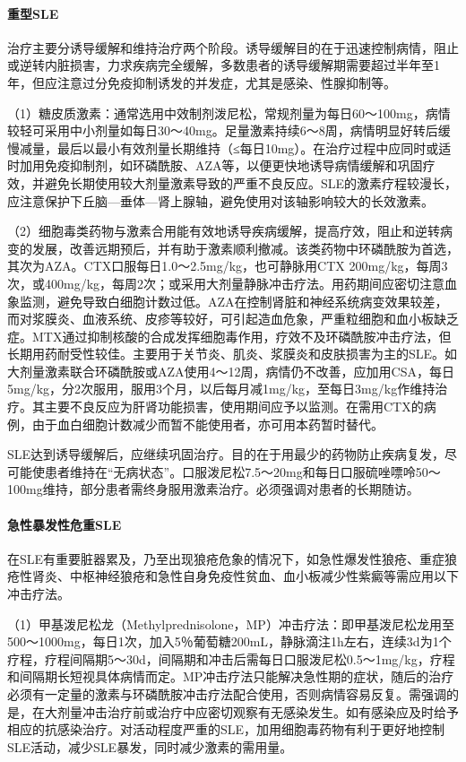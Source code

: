 \paragraph{重型SLE}

治疗主要分诱导缓解和维持治疗两个阶段。诱导缓解目的在于迅速控制病情，阻止或逆转内脏损害，力求疾病完全缓解，多数患者的诱导缓解期需要超过半年至1年，但应注意过分免疫抑制诱发的并发症，尤其是感染、性腺抑制等。

（1）糖皮质激素：通常选用中效制剂泼尼松，常规剂量为每日60～100mg，病情较轻可采用中小剂量如每日30～40mg。足量激素持续6～8周，病情明显好转后缓慢减量，最后以最小有效剂量长期维持（≤每日10mg）。在治疗过程中应同时或适时加用免疫抑制剂，如环磷酰胺、AZA等，以便更快地诱导病情缓解和巩固疗效，并避免长期使用较大剂量激素导致的严重不良反应。SLE的激素疗程较漫长，应注意保护下丘脑---垂体---肾上腺轴，避免使用对该轴影响较大的长效激素。

（2）细胞毒类药物与激素合用能有效地诱导疾病缓解，提高疗效，阻止和逆转病变的发展，改善远期预后，并有助于激素顺利撤减。该类药物中环磷酰胺为首选，其次为AZA。CTX口服每日1.0～2.5mg/kg，也可静脉用CTX
200mg/kg，每周3次，或400mg/kg，每周2次；或采用大剂量静脉冲击疗法。用药期间应密切注意血象监测，避免导致白细胞计数过低。AZA在控制肾脏和神经系统病变效果较差，而对浆膜炎、血液系统、皮疹等较好，可引起造血危象，严重粒细胞和血小板缺乏症。MTX通过抑制核酸的合成发挥细胞毒作用，疗效不及环磷酰胺冲击疗法，但长期用药耐受性较佳。主要用于关节炎、肌炎、浆膜炎和皮肤损害为主的SLE。如大剂量激素联合环磷酰胺或AZA使用4～12周，病情仍不改善，应加用CSA，每日5mg/kg，分2次服用，服用3个月，以后每月减1mg/kg，至每日3mg/kg作维持治疗。其主要不良反应为肝肾功能损害，使用期间应予以监测。在需用CTX的病例，由于血白细胞计数减少而暂不能使用者，亦可用本药暂时替代。

SLE达到诱导缓解后，应继续巩固治疗。目的在于用最少的药物防止疾病复发，尽可能使患者维持在“无病状态”。口服泼尼松7.5～20mg和每日口服硫唑嘌呤50～100mg维持，部分患者需终身服用激素治疗。必须强调对患者的长期随访。
\paragraph{急性暴发性危重SLE}

在SLE有重要脏器累及，乃至出现狼疮危象的情况下，如急性爆发性狼疮、重症狼疮性肾炎、中枢神经狼疮和急性自身免疫性贫血、血小板减少性紫癜等需应用以下冲击疗法。

（1）甲基泼尼松龙（Methylprednisolone，MP）冲击疗法：即甲基泼尼松龙用至500～1000mg，每日1次，加入5％葡萄糖200mL，静脉滴注1h左右，连续3d为1个疗程，疗程间隔期5～30d，间隔期和冲击后需每日口服泼尼松0.5～1mg/kg，疗程和间隔期长短视具体病情而定。MP冲击疗法只能解决急性期的症状，随后的治疗必须有一定量的激素与环磷酰胺冲击疗法配合使用，否则病情容易反复。需强调的是，在大剂量冲击治疗前或治疗中应密切观察有无感染发生。如有感染应及时给予相应的抗感染治疗。对活动程度严重的SLE，加用细胞毒药物有利于更好地控制SLE活动，减少SLE暴发，同时减少激素的需用量。

